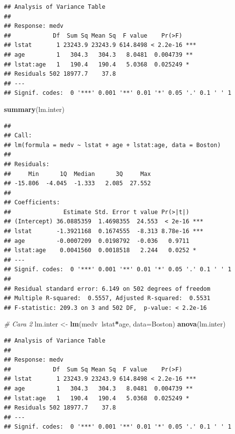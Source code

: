 \documentclass[]{book}
\newenvironment{Shaded}{\begin{snugshade}}{\end{snugshade}}
\newcommand{\CommentTok}[1]{\textcolor[rgb]{0.56,0.35,0.01}{\textit{#1}}}
\newcommand{\DataTypeTok}[1]{\textcolor[rgb]{0.13,0.29,0.53}{#1}}
\newcommand{\KeywordTok}[1]{\textcolor[rgb]{0.13,0.29,0.53}{\textbf{#1}}}
\newcommand{\NormalTok}[1]{#1}
\newcommand{\OperatorTok}[1]{\textcolor[rgb]{0.81,0.36,0.00}{\textbf{#1}}}
\newcommand{\StringTok}[1]{\textcolor[rgb]{0.31,0.60,0.02}{#1}}
\theoremstyle{definition}
\theoremstyle{definition}
\theoremstyle{definition}
\theoremstyle{remark}
\begin{document}
\begin{verbatim}
## Analysis of Variance Table
## 
## Response: medv
##            Df  Sum Sq Mean Sq  F value    Pr(>F)    
## lstat       1 23243.9 23243.9 614.8498 < 2.2e-16 ***
## age         1   304.3   304.3   8.0481  0.004739 ** 
## lstat:age   1   190.4   190.4   5.0368  0.025249 *  
## Residuals 502 18977.7    37.8                       
## ---
## Signif. codes:  0 '***' 0.001 '**' 0.01 '*' 0.05 '.' 0.1 ' ' 1
\end{verbatim}

\begin{Shaded}
\begin{Highlighting}[]
\KeywordTok{summary}\NormalTok{(lm.inter)}
\end{Highlighting}
\end{Shaded}

\begin{verbatim}
## 
## Call:
## lm(formula = medv ~ lstat + age + lstat:age, data = Boston)
## 
## Residuals:
##     Min      1Q  Median      3Q     Max 
## -15.806  -4.045  -1.333   2.085  27.552 
## 
## Coefficients:
##               Estimate Std. Error t value Pr(>|t|)    
## (Intercept) 36.0885359  1.4698355  24.553  < 2e-16 ***
## lstat       -1.3921168  0.1674555  -8.313 8.78e-16 ***
## age         -0.0007209  0.0198792  -0.036   0.9711    
## lstat:age    0.0041560  0.0018518   2.244   0.0252 *  
## ---
## Signif. codes:  0 '***' 0.001 '**' 0.01 '*' 0.05 '.' 0.1 ' ' 1
## 
## Residual standard error: 6.149 on 502 degrees of freedom
## Multiple R-squared:  0.5557, Adjusted R-squared:  0.5531 
## F-statistic: 209.3 on 3 and 502 DF,  p-value: < 2.2e-16
\end{verbatim}

\begin{Shaded}
\begin{Highlighting}[]
\CommentTok{# Cara 2}
\NormalTok{lm.inter <-}\StringTok{ }\KeywordTok{lm}\NormalTok{(medv}\OperatorTok{~}\NormalTok{lstat}\OperatorTok{*}\NormalTok{age, }\DataTypeTok{data=}\NormalTok{Boston)}
\KeywordTok{anova}\NormalTok{(lm.inter)}
\end{Highlighting}
\end{Shaded}

\begin{verbatim}
## Analysis of Variance Table
## 
## Response: medv
##            Df  Sum Sq Mean Sq  F value    Pr(>F)    
## lstat       1 23243.9 23243.9 614.8498 < 2.2e-16 ***
## age         1   304.3   304.3   8.0481  0.004739 ** 
## lstat:age   1   190.4   190.4   5.0368  0.025249 *  
## Residuals 502 18977.7    37.8                       
## ---
## Signif. codes:  0 '***' 0.001 '**' 0.01 '*' 0.05 '.' 0.1 ' ' 1
\end{verbatim}
\end{document}
